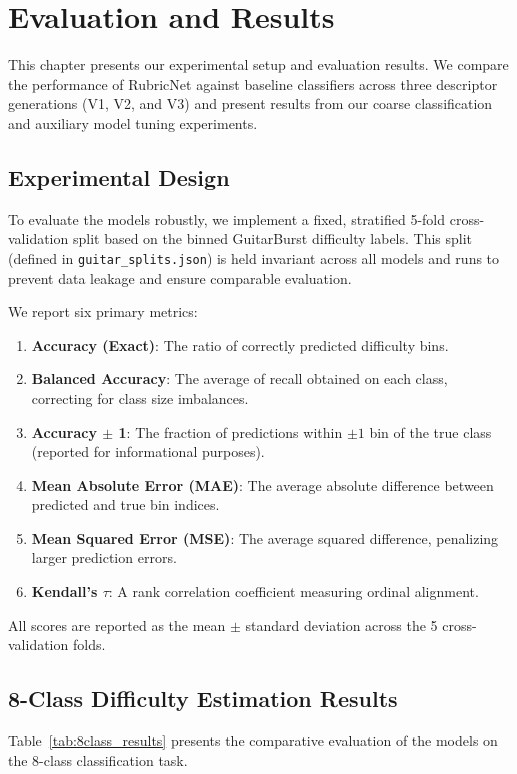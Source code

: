 \chapter{Evaluation and Results}
\label{ch:results}

This chapter presents our experimental setup and evaluation results. We compare the performance of RubricNet against baseline classifiers across three descriptor generations (V1, V2, and V3) and present results from our coarse classification and auxiliary model tuning experiments.

\section{Experimental Design}
To evaluate the models robustly, we implement a fixed, stratified 5-fold cross-validation split based on the binned GuitarBurst difficulty labels. This split (defined in \texttt{guitar\_splits.json}) is held invariant across all models and runs to prevent data leakage and ensure comparable evaluation.

We report six primary metrics:
\begin{enumerate}
    \item \textbf{Accuracy (Exact)}: The ratio of correctly predicted difficulty bins.
    \item \textbf{Balanced Accuracy}: The average of recall obtained on each class, correcting for class size imbalances.
    \item \textbf{Accuracy $\pm$ 1}: The fraction of predictions within $\pm 1$ bin of the true class (reported for informational purposes).
    \item \textbf{Mean Absolute Error (MAE)}: The average absolute difference between predicted and true bin indices.
    \item \textbf{Mean Squared Error (MSE)}: The average squared difference, penalizing larger prediction errors.
    \item \textbf{Kendall's $\tau$}: A rank correlation coefficient measuring ordinal alignment.
\end{enumerate}

All scores are reported as the mean $\pm$ standard deviation across the 5 cross-validation folds.

\section{8-Class Difficulty Estimation Results}
Table~\ref{tab:8class_results} presents the comparative evaluation of the models on the 8-class classification task.

